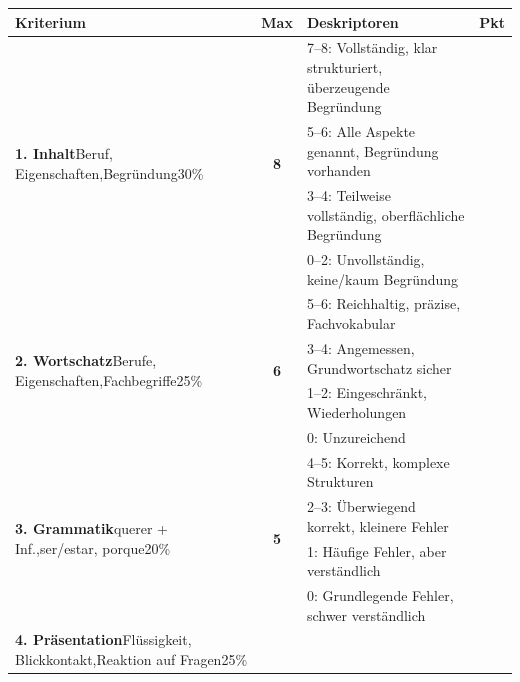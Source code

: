 \documentclass[11pt, a4paper]{article}
\begin{document}
\vspace{0.3cm}

\begin{tabular}{|p{3.5cm}|c|p{10cm}|c|}
\hline
\rowcolor{gruppeB!20}
\textbf{Kriterium} & \textbf{Max} & \textbf{Deskriptoren} & \textbf{Pkt} \\
\hline
\hline
\multirow{4}{3.5cm}{\textbf{1. Inhalt}\newline\scriptsize{Beruf, Eigenschaften,}\newline\scriptsize{Begründung}\newline\scriptsize{30\%}}
& \multirow{4}{*}{\textbf{8}}
& \scriptsize{7--8: Vollständig, klar strukturiert, überzeugende Begründung} & \\
& & \scriptsize{5--6: Alle Aspekte genannt, Begründung vorhanden} & \\
& & \scriptsize{3--4: Teilweise vollständig, oberflächliche Begründung} & \\
& & \scriptsize{0--2: Unvollständig, keine/kaum Begründung} & \\
\hline
\multirow{4}{3.5cm}{\textbf{2. Wortschatz}\newline\scriptsize{Berufe, Eigenschaften,}\newline\scriptsize{Fachbegriffe}\newline\scriptsize{25\%}}
& \multirow{4}{*}{\textbf{6}}
& \scriptsize{5--6: Reichhaltig, präzise, Fachvokabular} & \\
& & \scriptsize{3--4: Angemessen, Grundwortschatz sicher} & \\
& & \scriptsize{1--2: Eingeschränkt, Wiederholungen} & \\
& & \scriptsize{0: Unzureichend} & \\
\hline
\multirow{4}{3.5cm}{\textbf{3. Grammatik}\newline\scriptsize{querer + Inf.,}\newline\scriptsize{ser/estar, porque}\newline\scriptsize{20\%}}
& \multirow{4}{*}{\textbf{5}}
& \scriptsize{4--5: Korrekt, komplexe Strukturen} & \\
& & \scriptsize{2--3: Überwiegend korrekt, kleinere Fehler} & \\
& & \scriptsize{1: Häufige Fehler, aber verständlich} & \\
& & \scriptsize{0: Grundlegende Fehler, schwer verständlich} & \\
\hline
\multirow{4}{3.5cm}{\textbf{4. Präsentation}\newline\scriptsize{Flüssigkeit, Blickkontakt,}\newline\scriptsize{Reaktion auf Fragen}\newline\scriptsize{25\%}}

\end{tabular}
\end{document}
